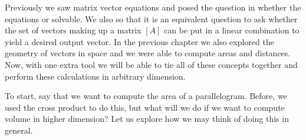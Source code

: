     Previously we saw matrix vector equations and posed the question in whether the equations or solvable. We also so that it is an equivalent question to ask whether the set of vectors making up a matrix $[A]$ can be put in a linear combination to yield a desired output vector.  In the previous chapter we also explored the geometry of vectors in space and we were able to compute areas and distances.  Now, with one extra tool we will be able to tie all of these concepts together and perform these calculations in arbitrary dimension.
    
    To start, say that we want to compute the area of a parallelogram. Before, we used the cross product to do this, but what will we do if we want to compute volume in higher dimension? Let us explore how we may think of doing this in general.
        
